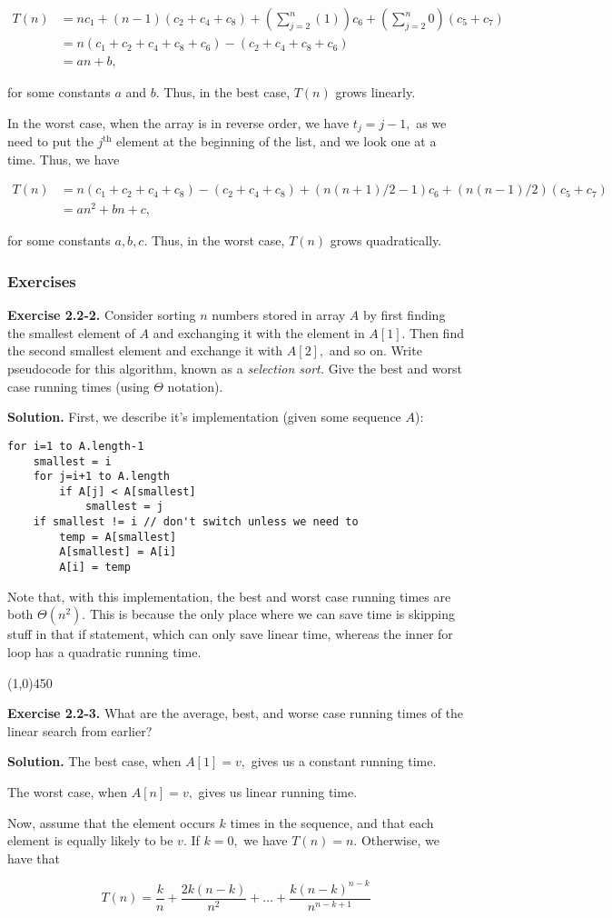 \documentclass{article}
\newcommand{\exec}[2]
{\textbf{Exercise #1.} #2

\textbf{Solution.}}
\newcommand{\bardiv}{\begin{center}
\line(1,0){450}
\end{center}}
\begin{document}
\begin{align*}
T(n) &= nc_1 + (n-1)(c_2 + c_4 + c_8) + (\sum_{j=2}^{n} (1))c_6 + (\sum_{j=2}^n 0)(c_5 + c_7) \\
     &= n(c_1 + c_2 + c_4 + c_8 + c_6) - (c_2 + c_4 + c_8 + c_6) \\
     &= an + b,
\end{align*}

for some constants $a$ and $b.$ Thus, in the best case, $T(n)$ grows linearly.

In the worst case, when the array is in reverse order, we have $t_j = j-1,$ as we need to put the $j^{\text{th}}$ element at the beginning of the list, and we look one at a time. Thus, we have

\begin{align*}
T(n) &= n(c_1+c_2+c_4+c_8) - (c_2+c_4+c_8) + (n(n+1)/2 - 1)c_6 +(n(n-1)/2)(c_5+c_7) \\
     &= an^2 + bn + c,
\end{align*}

for some constants $a, b, c.$ Thus, in the worst case, $T(n)$ grows quadratically.

\subsubsection{Exercises}

\exec{2.2-2}{Consider sorting $n$ numbers stored in array $A$ by first finding the smallest element of $A$ and exchanging it with the element in $A[1].$ Then find the second smallest element and exchange it with $A[2],$ and so on. Write pseudocode for this algorithm, known as a \textit{selection sort.} Give the best and worst case running times (using $\Theta$ notation).}
First, we describe it's implementation (given some sequence $A$):

\begin{lstlisting}
for i=1 to A.length-1
	smallest = i
	for j=i+1 to A.length
		if A[j] < A[smallest]
			smallest = j
	if smallest != i // don't switch unless we need to
		temp = A[smallest]
		A[smallest] = A[i]
		A[i] = temp
\end{lstlisting}

Note that, with this implementation, the best and worst case running times are both $\Theta(n^2).$ This is because the only place where we can save time is skipping stuff in that if statement, which can only save linear time, whereas the inner for loop has a quadratic running time.

\bardiv

\exec{2.2-3}{What are the average, best, and worse case running times of the linear search from earlier?}
The best case, when $A[1] = v,$ gives us a constant running time.

The worst case, when $A[n] = v,$ gives us linear running time.

Now, assume that the element occurs $k$ times in the sequence, and that each element is equally likely to be $v.$ If $k = 0,$ we have $T(n) = n.$ Otherwise, we have that

$$T(n) = \frac{k}{n} + \frac{2k(n-k)}{n^2} + \dots + \frac{k(n-k)^{n-k}}{n^{n-k+1}}$$
\end{document}

